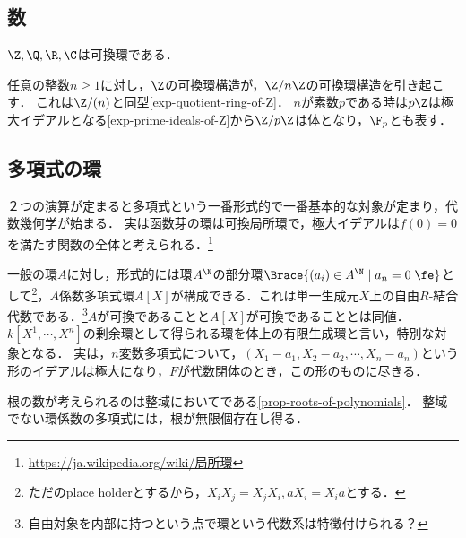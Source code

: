 \documentclass[uplatex,dvipdfmx]{jsreport}
\begin{document}
\subsection{数}

\begin{example}
    $\Z,\Q,\R,\C$は可換環である．
\end{example}

\begin{example}[整数の剰余環]
    任意の整数$n\ge 1$に対し，$\Z$の可換環構造が，$\Z/n\Z$の可換環構造を引き起こす．
    これは$\Z/(n)$と同型\ref{exp-quotient-ring-of-Z}．
    $n$が素数$p$である時は$p\Z$は極大イデアルとなる\ref{exp-prime-ideals-of-Z}から$\Z/p\Z$は体となり，$\F_p$とも表す．
\end{example}

\subsection{多項式の環}

\begin{tcolorbox}[colframe=ForestGreen, colback=ForestGreen!10!white,breakable,colbacktitle=ForestGreen!40!white,coltitle=black,fonttitle=\bfseries\sffamily,
title=]
    ２つの演算が定まると多項式という一番形式的で一番基本的な対象が定まり，代数幾何学が始まる．
    実は函数芽の環は可換局所環で，極大イデアルは$f(0)=0$を満たす関数の全体と考えられる．\footnote{\url{https://ja.wikipedia.org/wiki/局所環}}
\end{tcolorbox}

\begin{example}
    一般の環$A$に対し，形式的には環$A^\N$の部分環$\Brace{(a_i)\in A^\N\mid a_n=0\;\fe}$として\footnote{ただのplace holderとするから，$X_iX_j=X_jX_i,aX_i=X_ia$とする．}，$A$係数多項式環$A[X]$が構成できる．これは単一生成元$X$上の自由$R$-結合代数である．\footnote{自由対象を内部に持つという点で環という代数系は特徴付けられる？}$A$が可換であることと$A[X]$が可換であることとは同値．
    $k[X^1,\cdots,X^n]$の剰余環として得られる環を体上の有限生成環と言い，特別な対象となる．
    実は，$n$変数多項式について，$(X_1-a_1,X_2-a_2,\cdots,X_n-a_n)$という形のイデアルは極大になり，$F$が代数閉体のとき，この形のものに尽きる．
\end{example}

\begin{example}
    根の数が考えられるのは整域においてである\ref{prop-roots-of-polynomials}．
    整域でない環係数の多項式には，根が無限個存在し得る．
\end{example}
\end{document}

